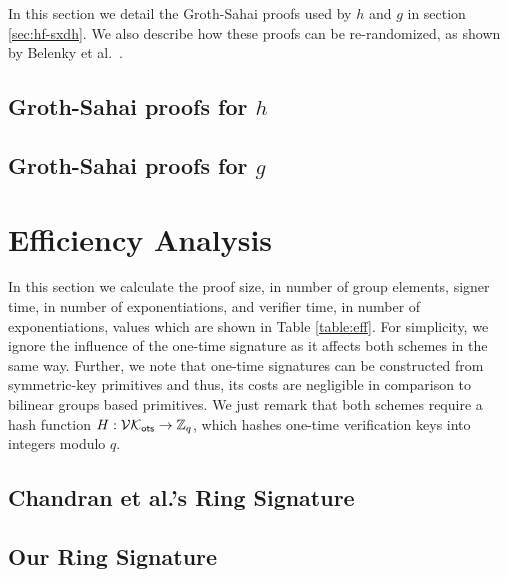 \documentclass{llncs}
\begin{document}
	In this section we detail the Groth-Sahai proofs used by $h$ and $g$ in section \ref{sec:hf-sxdh}. We also describe how these proofs can be re-randomized, as shown by Belenky et al.~\cite{C:BCCKLS09}.
		\subsection{Groth-Sahai proofs for $h$} \label{sec:GSproofs-h}
		
			
			
		\subsection{Groth-Sahai proofs for $g$} \label{sec:GSproofs-g}
		
			

%

	\section{Efficiency Analysis} \label{sec:eff-analysis}
		In this section we calculate the proof size, in number of group elements, signer time, in number of exponentiations, and verifier time, in number of exponentiations, values which are shown in Table \ref{table:eff}. For simplicity, we ignore the influence of the one-time signature as it affects both schemes in the same way. Further, we note that one-time signatures can be constructed from symmetric-key primitives and thus, its costs are negligible in comparison to bilinear groups based primitives. We just remark that both schemes require a hash function $H:\mathcal{VK}_{\mathsf{ots}}\to\mathbb{Z}_q$, which hashes one-time verification keys into integers modulo $q$.
		\subsection{Chandran et al.'s Ring Signature}
			
		\subsection{Our Ring Signature}
			
\end{document}
